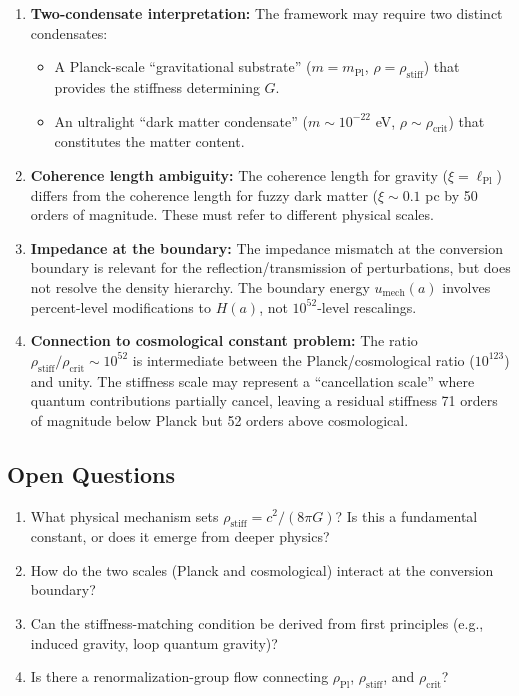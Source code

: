 \documentclass[11pt,a4paper]{article}
\newcommand{\lPl}{\ensuremath{\ell_{\mathrm{Pl}}}}
\newcommand{\mPl}{\ensuremath{m_{\mathrm{Pl}}}}
\newcommand{\rhocrit}{\ensuremath{\rho_{\mathrm{crit}}}}
\newcommand{\rhostiff}{\ensuremath{\rho_{\mathrm{stiff}}}}
\newcommand{\rhoPl}{\ensuremath{\rho_{\mathrm{Pl}}}}
\theoremstyle{definition}
\begin{document}
\begin{enumerate}
    \item \textbf{Two-condensate interpretation:} The framework may require two distinct condensates:
    \begin{itemize}
        \item A Planck-scale ``gravitational substrate'' ($m = \mPl$, $\rho = \rhostiff$) that provides the stiffness determining $G$.
        \item An ultralight ``dark matter condensate'' ($m \sim 10^{-22}$ eV, $\rho \sim \rhocrit$) that constitutes the matter content.
    \end{itemize}

    \item \textbf{Coherence length ambiguity:} The coherence length for gravity ($\xi = \lPl$) differs from the coherence length for fuzzy dark matter ($\xi \sim 0.1$ pc by 50 orders of magnitude. These must refer to different physical scales.

    \item \textbf{Impedance at the boundary:} The impedance mismatch at the conversion boundary is relevant for the reflection/transmission of perturbations, but does not resolve the density hierarchy. The boundary energy $u_{\mathrm{mech}}(a)$ involves percent-level modifications to $H(a)$, not $10^{52}$-level rescalings.

    \item \textbf{Connection to cosmological constant problem:} The ratio $\rhostiff/\rhocrit \sim 10^{52}$ is intermediate between the Planck/cosmological ratio ($10^{123}$) and unity. The stiffness scale may represent a ``cancellation scale'' where quantum contributions partially cancel, leaving a residual stiffness 71 orders of magnitude below Planck but 52 orders above cosmological.
\end{enumerate}

\subsection{Open Questions}

\begin{enumerate}
    \item What physical mechanism sets $\rhostiff = c^2/(8\pi G)$? Is this a fundamental constant, or does it emerge from deeper physics?

    \item How do the two scales (Planck and cosmological) interact at the conversion boundary?

    \item Can the stiffness-matching condition be derived from first principles (e.g., induced gravity, loop quantum gravity)?

    \item Is there a renormalization-group flow connecting $\rhoPl$, $\rhostiff$, and $\rhocrit$?
\end{enumerate}
\end{document}
